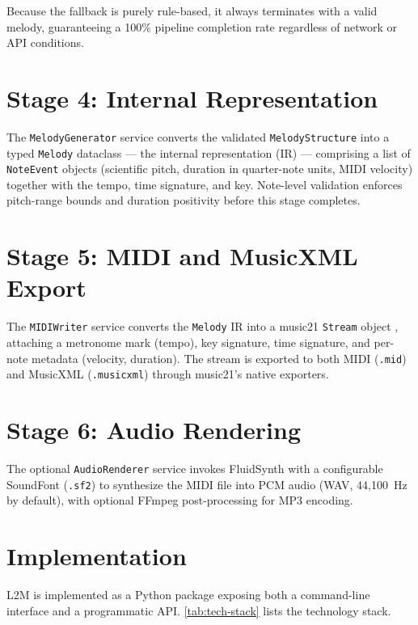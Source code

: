 Because the fallback is purely rule-based, it always terminates with a valid
melody, guaranteeing a 100\% pipeline completion rate regardless of network
or API conditions.

\section{Stage 4: Internal Representation}
\label{sec:mt-stage4}

The \texttt{MelodyGenerator} service converts the validated
\texttt{MelodyStructure} into a typed \texttt{Melody} dataclass --- the
internal representation (IR) --- comprising a list of \texttt{NoteEvent}
objects (scientific pitch, duration in quarter-note units, MIDI velocity)
together with the tempo, time signature, and key. Note-level validation
enforces pitch-range bounds and duration positivity before this stage
completes.

\section{Stage 5: MIDI and MusicXML Export}
\label{sec:mt-stage5}

The \texttt{MIDIWriter} service converts the \texttt{Melody} IR into a
music21 \texttt{Stream} object \cite{cuthbert10music21}, attaching a
metronome mark (tempo), key signature, time signature, and per-note
metadata (velocity, duration). The stream is exported to both MIDI
(\texttt{.mid}) and MusicXML (\texttt{.musicxml}) \cite{good01musicxml}
through music21's native exporters.

\section{Stage 6: Audio Rendering}
\label{sec:mt-stage6}

The optional \texttt{AudioRenderer} service invokes FluidSynth with a
configurable SoundFont (\texttt{.sf2}) to synthesize the MIDI file into PCM
audio (WAV, 44{,}100~Hz by default), with optional FFmpeg post-processing
for MP3 encoding.

\section{Implementation}
\label{sec:mt-implementation}

L2M is implemented as a Python package exposing both a command-line
interface and a programmatic API. \ref{tab:tech-stack} lists the
technology stack.

